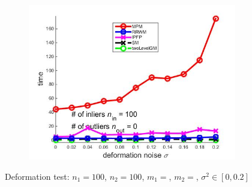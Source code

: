 \documentclass[
	fontsize=12pt,
	paper=a4,
	twoside=false,
	numbers=noenddot,
	plainheadsepline,
	toc=listof,
	toc=bibliography
]{scrartcl}
\begin{document}
\begin{figure}[ht]
\begin{subfigure}[b]{0.3\textwidth}
		\includegraphics[scale=0.25]{"fig_ver2108/syntheticPointSets/deformation_test/time_greedy"} 
	\end{subfigure} 	
	\caption{ Deformation test: $n_1=100$, $n_2=100$, $m_1=$, $m_2=$, $\sigma^2\in[0, 0.2]$}
\end{figure}

\FloatBarrier	
\end{document}
